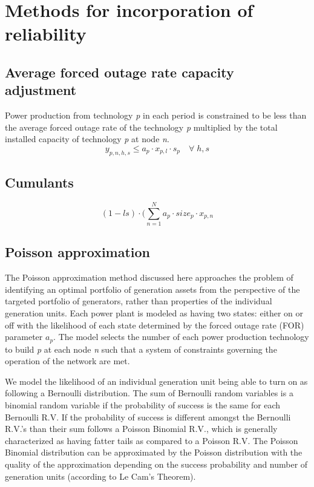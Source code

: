 \documentclass[10pt]{amsart}
\begin{document}
\section{Methods for incorporation of reliability}
\subsection{Average forced outage rate capacity adjustment}
Power production from technology \textit{p} in each period is constrained to be less than the average forced outage rate of the technology \textit{p} multiplied by the total installed capacity of technology \textit{p} at node \textit{n}.
\begin{equation}
y_{p,n,h,s} \leq a_{p} \cdot x_{p,l} \cdot s_{p} \quad \forall \; h,s
\end{equation}
\subsection{Cumulants}
\begin{equation}
(1 - ls)\cdot \big(\sum_{n=1}^{N} a_{p}\cdot size_{p} \cdot x_{p,n}
\end{equation}

\subsection{Poisson approximation}
The Poisson approximation method discussed here approaches the problem of identifying an optimal portfolio of generation assets from the perspective of the targeted portfolio of generators, rather than properties of the individual generation units.
Each power plant is modeled as having two states: either on or off with the likelihood of each state determined by the forced outage rate (FOR) parameter \textit{$a_{p}$}.
The model selects the number of each power production technology to build \textit{p} at each node \textit{n} such that a system of constraints governing the operation of the network are met.

We model the likelihood of an individual generation unit being able to turn on as following a Bernoulli distribution.
The sum of Bernoulli random variables is a binomial random variable if the probability of success is the same for each Bernoulli R.V.  
If the probability of success is different amongst the Bernoulli R.V.'s than their sum follows a Poisson Binomial R.V., which is generally characterized as having fatter tails as compared to a Poisson R.V.
The Poisson Binomial distribution can be approximated by the Poisson distribution  with the quality of the approximation depending on the success probability and number of generation units (according to Le Cam's Theorem).
\end{document}
